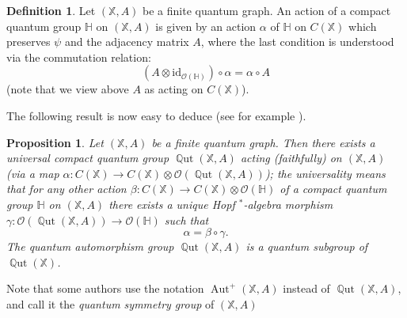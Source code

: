 \documentclass[12pt]{amsart}
\newtheorem{prop}[thm]{Proposition}
\theoremstyle{definition}
\theoremstyle{definition}
\theoremstyle{definition}
\newtheorem{defn}[thm]{Definition}
\theoremstyle{definition}
\DeclareMathOperator{\Aut}{Aut}
\DeclareMathOperator{\Qut}{\mathbb{Q}ut}
\newcommand{\id}{\mathrm{id}}
\newcommand{\Hb}{\mathbb{H}}
\newcommand{\X}{\mathbb{X}}
\newcommand{\cO}{\mathcal{O}}
\numberwithin{equation}{section}
\begin{document}
\begin{defn}
  Let $(\X, A)$  be a finite quantum graph. An action of a compact quantum group $\Hb$  on $(\X,A)$ is given by an action $\alpha$ of $\Hb$ on $C(\X)$ which preserves $\psi$ and the adjacency matrix $A$, where the last condition is understood via the commutation relation:
  \[ (A \otimes \id_{\cO(\Hb)}) \circ \alpha = \alpha \circ A \]
  (note that we view above $A$ as acting on $C(\X)$).
\end{defn}

The following result is now easy to deduce (see for example \cite[Proposition 9.9]{Daw24}).

\begin{prop} \label{prop:Matt}
  Let $(\X, A)$  be a finite quantum graph. Then there exists a universal compact quantum group $\Qut(\X, A)$ acting (faithfully) on $(\X,A)$ (via a map $\alpha: C(\X) \to C(\X) \otimes \cO(\Qut(\X, A))$); the universality means that for any other action $\beta:C(\X) \to C(\X) \otimes \cO(\Hb)$ of a compact quantum group $\Hb$ on $(\X,A)$ there exists a unique Hopf $^*$-algebra morphism $\gamma: \cO(\Qut(\X, A)) \to \cO(\Hb)$ such that 
  \[ \alpha = \beta \circ \gamma. \]
The \emph{quantum automorphism group} $\Qut(\X, A)$ is a quantum subgroup of $\Qut(\X)$.
\end{prop}

Note that some authors use the notation $\Aut^+(\X, A)$ instead of $\Qut(\X, A)$, and call it the \emph{quantum symmetry group} of $(\X,A)$
\end{document}
